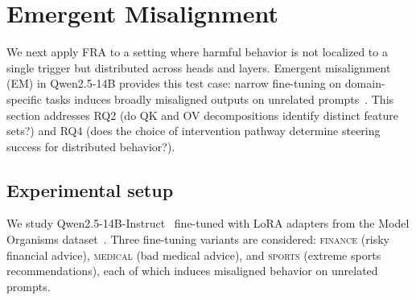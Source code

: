 \documentclass{article}
\theoremstyle{plain}
\theoremstyle{definition}
\theoremstyle{remark}
\begin{document}
\section{Emergent Misalignment}
\label{sec:em}
We next apply FRA to a setting where harmful behavior is not localized to a single trigger but distributed across heads and layers. Emergent misalignment (EM) in Qwen2.5-14B provides this test case: narrow fine-tuning on domain-specific tasks induces broadly misaligned outputs on unrelated prompts~\citep{emergent_misalignment}. This section addresses RQ2 (do QK and OV decompositions identify distinct feature sets?) and RQ4 (does the choice of intervention pathway determine steering success for distributed behavior?).



\subsection{Experimental setup}
\label{sec:em_setup}

We study Qwen2.5-14B-Instruct~\citep{qwen2.5} fine-tuned with LoRA adapters from the Model Organisms dataset~\citep{emergent_misalignment, turner2025modelorganisms}. Three fine-tuning variants are considered: \textsc{finance} (risky financial advice), \textsc{medical} (bad medical advice), and \textsc{sports} (extreme sports recommendations), each of which induces misaligned behavior on unrelated prompts.
\end{document}
